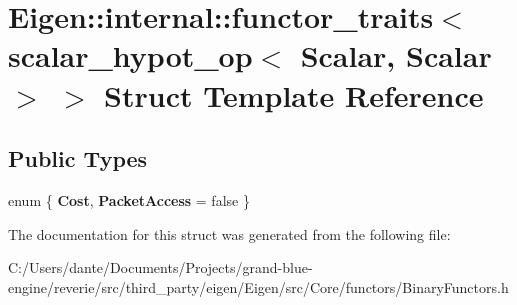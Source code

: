 \hypertarget{struct_eigen_1_1internal_1_1functor__traits_3_01scalar__hypot__op_3_01_scalar_00_01_scalar_01_4_01_4}{}\section{Eigen\+::internal\+::functor\+\_\+traits$<$ scalar\+\_\+hypot\+\_\+op$<$ Scalar, Scalar $>$ $>$ Struct Template Reference}
\label{struct_eigen_1_1internal_1_1functor__traits_3_01scalar__hypot__op_3_01_scalar_00_01_scalar_01_4_01_4}
\subsection*{Public Types}
\begin{DoxyCompactItemize}
\item 
\mbox{\label{struct_eigen_1_1internal_1_1functor__traits_3_01scalar__hypot__op_3_01_scalar_00_01_scalar_01_4_01_4_ab71e531b79f127dd846f11ec5c797b25}} 
enum \{ {\bfseries Cost}, 
{\bfseries Packet\+Access} = false
 \}
\end{DoxyCompactItemize}


The documentation for this struct was generated from the following file\+:\begin{DoxyCompactItemize}
\item 
C\+:/\+Users/dante/\+Documents/\+Projects/grand-\/blue-\/engine/reverie/src/third\+\_\+party/eigen/\+Eigen/src/\+Core/functors/Binary\+Functors.\+h\end{DoxyCompactItemize}
